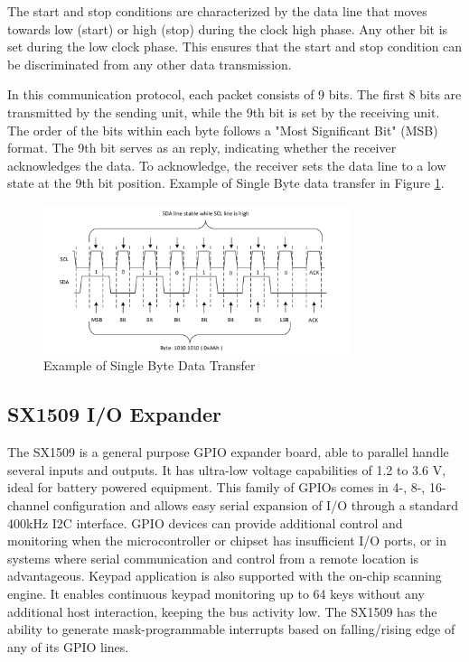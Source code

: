 \documentclass[english]{article}
\begin{document}
The start and stop conditions are characterized by the data line that
moves towards low (start) or high (stop) during the clock high phase.
Any other bit is set during the low clock phase. This ensures that the
start and stop condition can be discriminated from any other data
transmission.\newline

In this communication protocol, each packet consists of 9 bits. 
The first 8 bits are transmitted by the sending unit, while the 9th bit is set by the receiving unit. 
The order of the bits within each byte follows a "Most Significant Bit" (MSB) format. 
The 9th bit serves as an reply, indicating whether the receiver acknowledges the data. 
To acknowledge, the receiver sets the data line to a low state at the 9th bit position.
Example of Single Byte data transfer in Figure \ref{fig:Data}.
\begin{figure}[!h]
	\centering
	\includegraphics[width=0.80\textwidth,]{figures/Single_byte.png}
	\caption{Example of Single Byte Data Transfer}
	\label{fig:Data}
\end{figure}

\subsection{SX1509 I/O Expander}
The SX1509 is a general purpose GPIO expander board, able to parallel handle several inputs and outputs. It has ultra-low voltage capabilities of 1.2 to 3.6 V, ideal for battery powered equipment. This family of
GPIOs comes in 4-, 8-, 16-channel configuration and
allows easy serial expansion of I/O through a
standard 400kHz I2C interface. GPIO devices can
provide additional control and monitoring when the
microcontroller or chipset has insufficient I/O ports, or
in systems where serial communication and control
from a remote location is advantageous. Keypad application is also supported with
the on-chip scanning engine. It enables
continuous keypad monitoring up to 64 keys without
any additional host interaction, keeping the bus activity low. The SX1509 has the ability to generate mask-programmable interrupts based on
falling/rising edge of any of its GPIO lines. \newline
\end{document}
